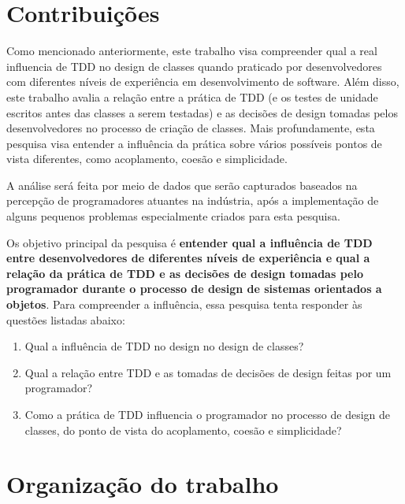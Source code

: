 \section{Contribuições}

Como mencionado anteriormente, este trabalho
visa compreender qual a real influencia de TDD no design de classes quando praticado
por desenvolvedores com diferentes níveis de experiência em desenvolvimento de 
software.
Além disso, este trabalho avalia a relação entre a prática de TDD (e os testes de unidade
escritos antes das classes a serem testadas) e as decisões de design tomadas 
pelos desenvolvedores no processo de criação de classes.
Mais profundamente, esta pesquisa visa entender a influência da prática
sobre vários possíveis pontos de vista diferentes, como 
acoplamento, coesão e simplicidade.

A análise será feita por meio de dados que serão
capturados baseados na percepção de programadores atuantes na indústria, após
a implementação de alguns pequenos problemas especialmente criados para
esta pesquisa.

Os objetivo principal da pesquisa é \textbf{entender qual a influência de TDD entre
desenvolvedores de diferentes níveis de experiência e qual a relação da prática de TDD 
e as decisões de design tomadas pelo programador durante o processo de design de sistemas orientados a objetos}.
Para compreender a influência, essa pesquisa tenta responder às questões listadas
abaixo:

\begin{enumerate}

	\item Qual a influência de TDD no design no design de classes?

	\item Qual a relação entre TDD e as tomadas de decisões de design
	feitas por um programador?

	\item Como a prática de TDD influencia o programador no processo de  
	design de classes, do ponto de vista do acoplamento, coesão e simplicidade?

\end{enumerate}

\section{Organização do trabalho}

